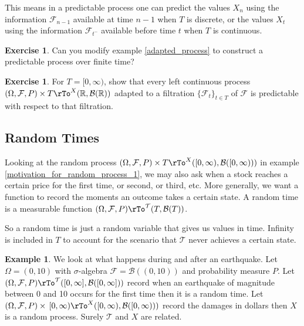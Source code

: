 \documentclass[12pt]{amsart}
\theoremstyle{definition}
\newtheorem{example}[theorem]{Example}
\newtheorem{exercise}[theorem]{Exercise}
\begin{document}
This means in a predictable process one can predict the values $X_n$ using the information $\mathcal{F}_{n-1}$ available at time ${n-1}$ when $T$ is discrete, or the values $X_t$ using the information $\mathcal{F}_{t^-}$ available before time $t$ when $T$ is continuous.

\begin{exercise} Can you modify example \ref{adapted_process} to construct a predictable process over finite time?
\end{exercise}

\begin{exercise} For $T = [0, \infty)$, show that every left continuous process $(\Omega, \mathcal{F}, P) \times T \rTo^X (\mathbb{R}, \mathcal{B}(\mathbb{R}))$ adapted to a filtration $\{\mathcal{F}_t\}_{t \in T}$ of $\mathcal{F}$ is predictable with respect to that filtration.
\end{exercise}

\subsection{Random Times} \label{random_times} Looking at the random process $(\Omega, \mathcal{F}, P) \times T \rTo^X ([0,\infty), \mathcal{B}([0,\infty)))$ in example \ref{motivation_for_random_process_1}, we may also ask when a stock reaches a certain price for the first time, or second, or third, etc. More generally, we want a function to record the moments an outcome takes a certain state.
\dfn A random time is a measurable function $(\Omega, \mathcal{F}, P) \rTo^{\mathcal{T}} (T, \mathcal{B}(T))$.

So a random time is just a random variable that gives us values in time. Infinity is included in $T$ to account for the scenario that $\mathcal{T}$ never achieves a certain state.

\begin{example} We look at what happens during and after an earthquake. Let $\Omega = (0, 10)$ with $\sigma$-algebra $\mathcal{F} = \mathcal{B}((0, 10))$ and probability measure $P$. Let $(\Omega, \mathcal{F}, P) \rTo^{\mathcal{T}} ([0,\infty], \mathcal{B}([0, \infty]))$ record when an earthquake of magnitude between 0 and 10 occurs for the first time then it is a random time. Let $(\Omega, \mathcal{F}, P) \times \, [0,\infty) \rTo^X ([0,\infty), \mathcal{B}([0,\infty)))$ record the damages in dollars then $X$ is a random process. Surely $\mathcal{T}$ and $X$ are related.
\end{example}
\end{document}
